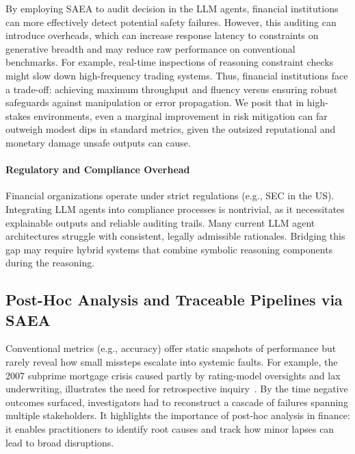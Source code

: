 By employing SAEA to audit decision in the LLM agents, financial institutions can more effectively detect potential safety failures. However, this auditing can introduce overheads, which can increase response latency to constraints on generative breadth and may reduce raw performance on conventional benchmarks. For example, real-time inspections of reasoning constraint checks might slow down high-frequency trading systems. Thus, financial institutions face a trade-off: achieving maximum throughput and fluency versus ensuring robust safeguards against manipulation or error propagation. 
We posit that in high-stakes environments, even a marginal improvement in risk mitigation can far outweigh modest dips in standard metrics, given the outsized reputational and monetary damage unsafe outputs can cause. 






\paragraph{Regulatory and Compliance Overhead}
Financial organizations operate under strict regulations (e.g., SEC in the US). Integrating LLM agents into compliance processes is nontrivial, as it necessitates explainable outputs and reliable auditing trails. Many current LLM agent architectures struggle with consistent, legally admissible rationales. Bridging this gap may require hybrid systems that combine symbolic reasoning components during the reasoning.


\subsection{Post-Hoc Analysis and Traceable Pipelines via SAEA}

Conventional metrics (e.g., accuracy) offer static snapshots of performance but rarely reveal how small missteps escalate into systemic faults. 
For example, the 2007 subprime mortgage crisis caused partly by rating-model oversights and lax underwriting, illustrates the need for retrospective inquiry~\citep{reinhart20082007}. By the time negative outcomes surfaced, investigators had to reconstruct a cascade of failures spanning multiple stakeholders. It highlights the importance of post-hoc analysis in finance: it enables practitioners to identify root causes and track how minor lapses can lead to broad disruptions.

